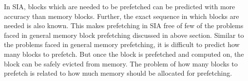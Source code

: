 In SIA, blocks which are needed to be prefetched can be predicted with more accuracy
than memory blocks. Further, the exact sequence in which blocks are needed is also known.
This makes prefetching in SIA free of few of the problems faced in general memory
block prefetching discussed in above section. Similar to the problems faced in general
memory prefetching, it is difficult to predict how many blocks to prefetch. But
once the block is prefetched and computed on, the block can be safely evicted from
memory. The problem of how many blocks to prefetch is related to how much memory
should be allocated for prefetching.

